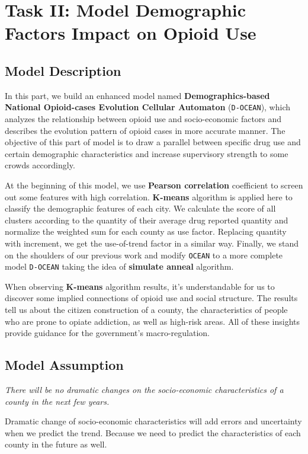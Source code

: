 \documentclass[a4paper]{article}
\begin{document}
\section{\textbf{Task II}: Model Demographic Factors Impact on Opioid Use}


\subsection{Model Description}

In this part, we build an enhanced model named \textbf{Demographics-based National Opioid-cases Evolution Cellular Automaton} (\texttt{D-OCEAN}), which analyzes the relationship between opioid use and socio-economic factors and describes the evolution pattern of opioid cases in more accurate manner. The objective of this part of model is to draw a parallel between specific drug use and certain demographic characteristics and increase supervisory strength to some crowds accordingly.

At the beginning of this model, we use \textbf{Pearson correlation} coefficient to screen out some features with high correlation. \textbf{K-means} algorithm is applied here to classify the demographic features of each city. We calculate the score of all clusters according to the quantity of their average drug reported quantity and normalize the weighted sum for each county as use factor. Replacing quantity with increment, we get the use-of-trend factor in a similar way. Finally, we stand on the shoulders of our previous work and modify \texttt{OCEAN} to a more complete model \texttt{D-OCEAN} taking the idea of \textbf{simulate anneal} algorithm.

When observing \textbf{K-means} algorithm results, it's understandable for us to discover some implied connections of opioid use and social structure. The results tell us about the citizen construction of a county, the characteristics of people who are prone to opiate addiction, as well as high-risk areas. All of these insights provide guidance for the government's macro-regulation.


\subsection{Model Assumption}

\vspace{8pt}
\begin{assumption}
\textit{There will be no dramatic changes on the socio-economic characteristics of a county in the next few years.}
\end{assumption}
Dramatic change of socio-economic characteristics will add errors and uncertainty when we predict the trend. Because we need to predict the characteristics of each county in the future as well.
\end{document}
